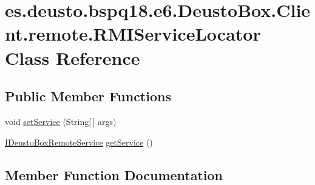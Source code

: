 \hypertarget{classes_1_1deusto_1_1bspq18_1_1e6_1_1_deusto_box_1_1_client_1_1remote_1_1_r_m_i_service_locator}{}\section{es.\+deusto.\+bspq18.\+e6.\+Deusto\+Box.\+Client.\+remote.\+R\+M\+I\+Service\+Locator Class Reference}
\label{classes_1_1deusto_1_1bspq18_1_1e6_1_1_deusto_box_1_1_client_1_1remote_1_1_r_m_i_service_locator}
\subsection*{Public Member Functions}
\begin{DoxyCompactItemize}
\item 
void \mbox{\hyperlink{classes_1_1deusto_1_1bspq18_1_1e6_1_1_deusto_box_1_1_client_1_1remote_1_1_r_m_i_service_locator_a1749b62b640d1de7edbf2b26dcf3cd31}{set\+Service}} (String\mbox{[}$\,$\mbox{]} args)
\item 
\mbox{\hyperlink{interfacees_1_1deusto_1_1bspq18_1_1e6_1_1_deusto_box_1_1_server_1_1remote_1_1_i_deusto_box_remote_service}{I\+Deusto\+Box\+Remote\+Service}} \mbox{\hyperlink{classes_1_1deusto_1_1bspq18_1_1e6_1_1_deusto_box_1_1_client_1_1remote_1_1_r_m_i_service_locator_aca058203bb5ac0231af2674708c0861d}{get\+Service}} ()
\end{DoxyCompactItemize}


\subsection{Member Function Documentation}
\mbox{\label{classes_1_1deusto_1_1bspq18_1_1e6_1_1_deusto_box_1_1_client_1_1remote_1_1_r_m_i_service_locator_aca058203bb5ac0231af2674708c0861d}} 
